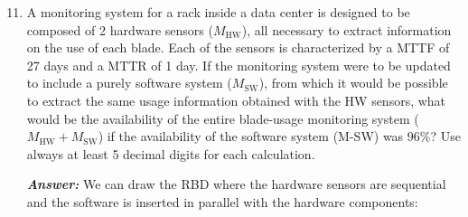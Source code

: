 \begin{enumerate}
    \setcounter{enumi}{10}

    \item A monitoring system for a rack inside a data center is designed to be composed of 2 hardware sensors ($M_{\text{HW}}$), all necessary to extract information on the use of each blade. Each of the sensors is characterized by a MTTF of 27 days and a MTTR of 1 day. If the monitoring system were to be updated to include a purely software system ($M_{\text{SW}}$), from which it would be possible to extract the same usage information obtained with the HW sensors, what would be the availability of the entire blade-usage monitoring system ($M_{\text{HW}} + M_{\text{SW}}$) if the availability of the software system (M-SW) was 96\%? Use always at least 5 decimal digits for each calculation.

    \textcolor{Green3}{\textbf{\emph{Answer:}}} We can draw the RBD where the hardware sensors are sequential and the software is inserted in parallel with the hardware components:
    \begin{center}
\end{center}
\end{enumerate}
